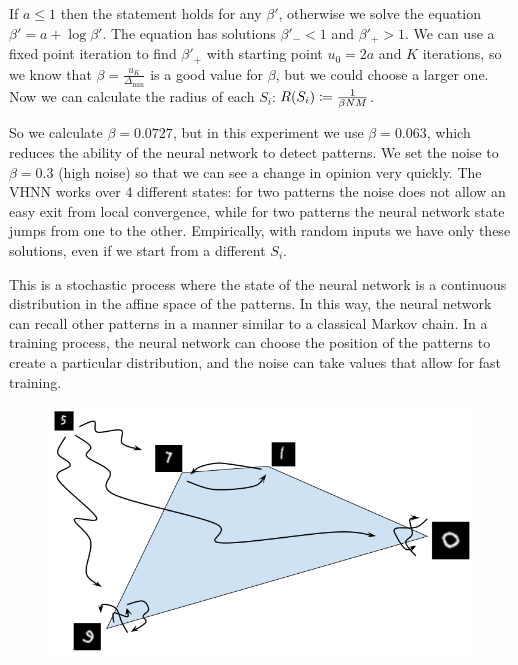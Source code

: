 \noindent If $a\leq1$ then the statement holds for any $\beta'$, otherwise we solve the equation $\beta'=a+\log\beta'$. The equation has solutions $\beta'_- < 1$ and $\beta'_+>1$.
We can use a fixed point iteration to find $\beta'_+$ with starting point $u_0=2a$ and $K$ iterations, so we know that $\beta = \frac{u_K}{\Delta_{\min}}$ is a good value for $\beta$, but we could choose a larger one. Now we can calculate the radius of each $S_i$: $R(S_i) \coloneqq \frac{1}{\beta N M}$.

\noindent So we calculate $\beta = 0.0727$, but in this experiment we use $\beta=0.063$, which reduces the ability of the neural network to detect patterns. We set the noise to $\beta=0.3$ (high noise) so that we can see a change in opinion very quickly. The VHNN works over $4$ different states: for two patterns the noise does not allow an easy exit from local convergence, while for two patterns the neural network state jumps from one to the other. Empirically, with random inputs we have only these solutions, even if we start from a different $S_i$.

\noindent This is a stochastic process where the state of the neural network is a continuous distribution in the affine space of the patterns. In this way, the neural network can recall other patterns in a manner similar to a classical Markov chain. In a training process, the neural network can choose the position of the patterns to create a particular distribution, and the noise can take values that allow for fast training.

\begin{figure}[htbp]
    \centering
    \includegraphics[width=0.6\linewidth]{Figures/VHNNdiagram.png}
    \label{fig:VHNNexample}
\end{figure}
